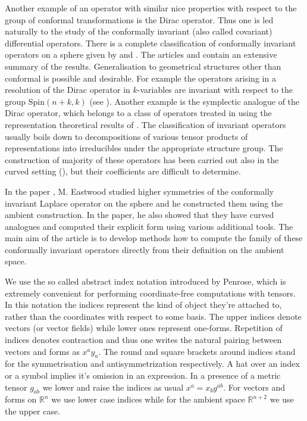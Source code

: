 \documentclass[final]{birkmult}
\theoremstyle{definition}
\theoremstyle{remark}
\numberwithin{equation}{section}
\begin{document}
  Another example of an operator with similar nice properties with respect to the group of conformal transformations is the Dirac operator. Thus one is led naturally to the study of the  conformally invariant (also called covariant) differential operators. 
There is a complete classification of conformally invariant operators on a sphere given by \cite{er} and \cite{Baston}. The articles \cite{be} and \cite{slovk_invariant_1992} contain an extensive summary of the results.  Generalisation to geometrical structures other than conformal is possible and desirable. For example the operators arising in a resolution of the Dirac operator in $k$-variables are invariant with respect to the group $\mathrm{Spin}(n+k,k)$ (see \cite{pf,pf2}).  Another example is the symplectic analogue of the Dirac operator, which belongs to a class of operators treated in \cite{ks} using the representation theoretical results of \cite{ks2}. The classification of invariant operators usually boils down to decompositions of various tensor products of representations into irreducibles under the appropriate structure group. The construction of majority of these operators has been carried out also in the curved setting (\cite{css,cd,es}), but their coefficients are difficult to determine.

In the paper \cite{Eastwood}, M. Eastwood studied higher symmetries of the conformally invariant Laplace operator on the sphere and he constructed them using the ambient construction. In the paper, he also showed that they have curved analogues
and computed their explicit form using various additional tools. The main aim of the article
is to develop methods how to compute the family of these conformally invariant operators
directly from their definition on the ambient space.

  We use the so called abstract index notation introduced by Penrose, which is extremely convenient for performing coordinate-free computations with tensors. In this notation the indices represent the kind of object they're attached to, rather than the coordinates with respect to some basis. The upper indices denote vectors (or vector fields) while lower ones represent one-forms. Repetition of indices denotes contraction and thus one writes the natural pairing between vectors and forms as $x^ay_a$. The round and square brackets around indices stand for the symmetrisation and antisymmetrization respectively. A hat over an index or a symbol implies it's omission in an expression.  In a presence of a metric tensor $g_{ab}$ we lower and raise the indices as usual $x^a = x_b g^{ab}$. For vectors and forms on $\mathbb{R}^n$ we use lower case indices while for the ambient space $\mathbb{R}^{n+2}$ we use the upper case.
\end{document}
